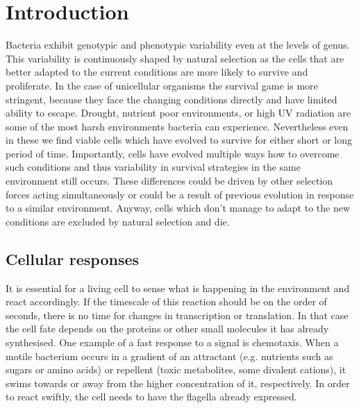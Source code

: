 \chapter{Introduction}
\setcounter{page}{1}

\shorthandoff{-}

Bacteria exhibit genotypic and phenotypic variability even at the levels of genus.
This variability is continuously shaped by natural selection as the cells that are better adapted to the current conditions are more likely to survive and proliferate.
In the case of unicellular organisms the survival game is more stringent, because they face the changing conditions directly and have limited ability to escape.
Drought, nutrient poor environments, or high UV radiation are some of the most harsh environments bacteria can experience.
Nevertheless even in these we find viable cells which have evolved to survive for either short or long period of time.
Importantly, cells have evolved multiple ways how to overcome such conditions and thus variability in survival strategies in the same environment still occurs.
These differences could be driven by other selection forces acting simultaneously or could be a result of previous evolution in response to a similar environment.
Anyway, cells which don't manage to adapt to the new conditions are excluded by natural selection and die.

\section{Cellular responses}
It is essential for a living cell to sense what is happening in the environment and react accordingly.
If the timescale of this reaction should be on the order of seconds, there is no time for changes in transcription or translation.
In that case the cell fate depends on the proteins or other small molecules it has already synthesised.
One example of a fast response to a signal is chemotaxis.
When a motile bacterium occurs in a gradient of an attractant (e.g. nutrients such as sugars or amino acids) or repellent (toxic metabolites, some divalent cations), it swims towards or away from the higher concentration of it, respectively.
In order to react swiftly, the cell needs to have the flagella already expressed.

